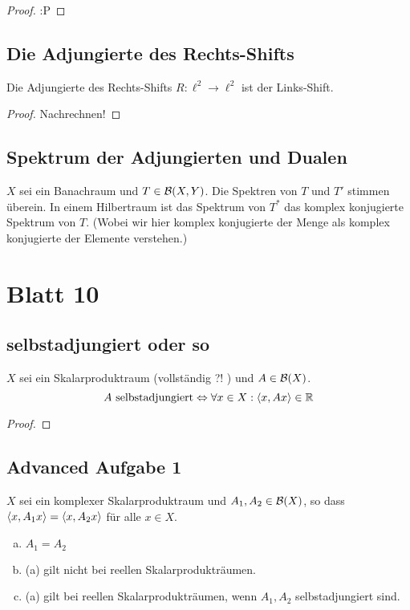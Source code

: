 \documentclass[FunkAnaskriptSS2017.tex]{subfiles}
\begin{document}
	\begin{proof}
	:P
	\end{proof}


\subsection{ Die Adjungierte des Rechts-Shifts}
\label{B9.4}
	Die Adjungierte des Rechts-Shifts $R:\ell^2 \to \ell ^2$ ist der Links-Shift.
	\begin{proof}
	Nachrechnen!
	\end{proof}


\subsection{ Spektrum der Adjungierten und Dualen}
\label{B9.5}
	$X$ sei ein Banachraum und $T\in \mathcal{B}(X,Y)$. Die Spektren von $T$ und $T'$ stimmen überein. In einem Hilbertraum ist das Spektrum von $T^*$ das komplex konjugierte Spektrum von $T$. (Wobei wir hier komplex konjugierte der Menge als komplex konjugierte der Elemente verstehen.)
	

\newpage
\section{ Blatt 10}

\subsection{ selbstadjungiert oder so}
\label{B10.1}
	$X$ sei ein Skalarproduktraum (vollständig ?! ) und $A \in \mathcal{B}(X)$. 
	$$ A \text{ selbstadjungiert} \Leftrightarrow \forall x \in X : \left \langle x,Ax \right \rangle \in \mathbb{R} $$
	\begin{proof}
	
	\end{proof}


\subsection{ Advanced Aufgabe 1}
\label{B10.2}
	$X$ sei ein komplexer Skalarproduktraum und $A_1, A_2 \in \mathcal{B}(X)$, so dass $\left \langle x, A_1 x \right \rangle = \left \langle x, A_2 x \right \rangle$ für alle $x\in X$.
	\begin{enumerate}[(a)]
		\item $A_1 = A_2$
		\item (a) gilt nicht bei reellen Skalarprodukträumen.
		\item (a) gilt bei reellen Skalarprodukträumen, wenn $A_1,A_2$ selbstadjungiert sind.
	\end{enumerate}
\end{document}
